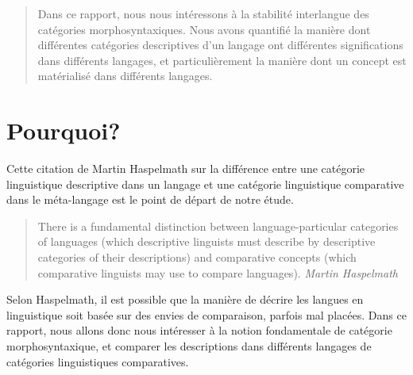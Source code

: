 


    \begin{abstract}
        Dans ce rapport, nous nous intéressons à la stabilité interlangue des catégories morphosyntaxiques.
        Nous avons quantifié la manière dont différentes catégories descriptives d'un langage ont différentes
        significations dans différents langages,
        et particulièrement la manière dont un concept est matérialisé dans différents langages.
    \end{abstract}


    \section{Pourquoi?}
    Cette citation de Martin Haspelmath sur la différence entre une catégorie linguistique descriptive dans un langage et une catégorie linguistique comparative dans le méta-langage est le point de départ de notre étude.
    \begin{quote}
        There is a fundamental distinction between language-particular categories of languages (which descriptive
        linguists must describe by descriptive categories of their descriptions) and comparative concepts (which
        comparative linguists may use to compare languages).
        {\flushright
    {\textit{Martin Haspelmath} \cite{Has18}}}
    \end{quote}
    Selon Haspelmath, il est possible que la manière de décrire les langues en linguistique soit basée sur des envies de comparaison, parfois mal placées.
    Dans ce rapport, nous allons donc nous intéresser à la notion fondamentale de catégorie morphosyntaxique, et
    comparer les descriptions dans différents langages de catégories linguistiques comparatives.

